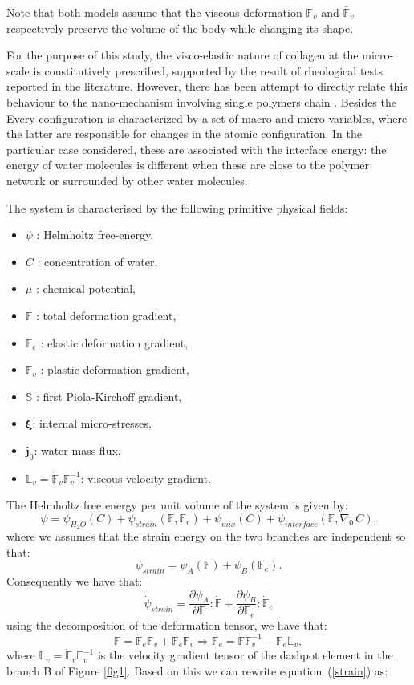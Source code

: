 \documentclass[12pt]{extarticle}
\newcommand{\F}{\ensuremath{\mathbb{F}}}
\newcommand{\LL}{\ensuremath{\mathbb{L}}}
\begin{document}
Note that both models assume that the viscous deformation $\F_v$ and $\bar{\F}_v$ respectively preserve the volume of the body while changing its shape. 

For the purpose of this study, the visco-elastic nature of collagen at the micro-scale is constitutively prescribed, supported by the result of rheological tests reported in the literature. However, there has been attempt to directly relate this behaviour to the nano-mechanism involving single polymers chain \cite{BERGSTROM1998931}. Besides the
Every configuration is characterized by a set of macro and micro variables, where the latter are responsible for changes in the atomic configuration. In the particular case considered, these are associated with the interface energy: the energy of water molecules is different when these are close to the polymer network or surrounded by other water molecules. 

The system is characterised by the following primitive physical fields: 
\begin{itemize}
	\item $\psi$ : Helmholtz free-energy,
	\item $C$ : concentration of water,
	\item $\mu$ : chemical potential,
	\item $\F$ : total deformation gradient,
	\item $\F_e$ : elastic deformation gradient,
	\item $\F_v$ : plastic deformation gradient,
	\item $\mathbb{S}$ : first Piola-Kirchoff gradient,
	\item $\boldsymbol{\xi}$: internal micro-stresses,
	\item $\mathbf{j}_0$: water mass flux,
	\item $\LL_v=\dot{\F}_v\F^{-1}_v$: viscous velocity gradient.
\end{itemize} 

The Helmholtz free energy per unit volume of the system is given by:
\begin{equation}
\psi = \psi_{H_2O}(C) + \psi_{strain}(\F,\F_e) + \psi_{mix}(C) + \psi_{interface}(\F,\nabla_0 \, C).
\end{equation}
where we assumes that the strain energy on the two branches are independent so that:
\begin{equation}
\psi_{strain}=\psi_{A}(\F)+\psi_{B}(\F_e).
\label{strain}
\end{equation}
Consequently we have that:
\begin{equation}
\dot{\psi}_{strain}= \frac{\partial \psi_A}{\partial \F}:\dot{\F} +  \frac{\partial \psi_B}{\partial \F_e}:\dot{\F}_e
\end{equation}
using the decomposition of the deformation tensor, we have that:
\begin{equation}
\dot{\F}=\dot{\F}_e\F_v+\F_e\dot{\F}_v \Longrightarrow \dot{\F}_e=\dot{\F}\F_v^{-1}-\F_e \LL_v,
\end{equation}
where $\LL_v=\dot{\F}_v\F_v^{-1}$ is the velocity gradient tensor of the dashpot element in the branch B of Figure \ref{fig1}. Based on this we can rewrite equation~(\ref{strain}) as:
\end{document}
